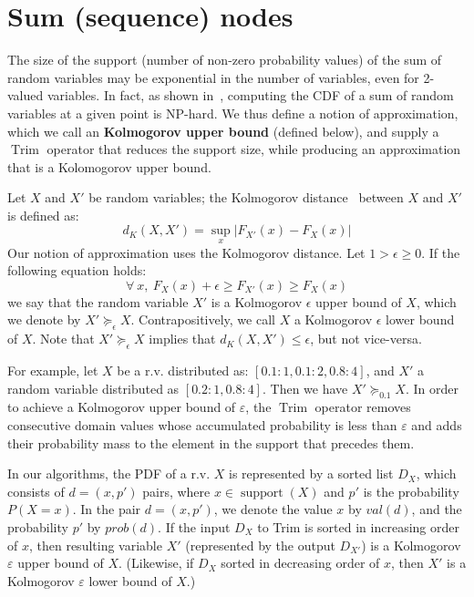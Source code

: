 \documentclass{article}
\DeclareMathOperator{\support}{support}
\DeclareMathOperator{\Trim}{Trim}
\begin{document}
 
\section{Sum (sequence) nodes}\label{sec:seq}

The size of the support (number of non-zero probability values) of the sum of random variables
may be exponential in the number of variables, even for 2-valued variables.
In fact, as shown in~\cite{}, computing the CDF of a sum of random variables at a given point is NP-hard.
We thus define a notion of approximation, 
which we call an {\bf Kolmogorov upper bound} (defined below),
and supply a $\Trim$ operator that reduces the support size, while 
producing an approximation that is a Kolomogorov upper bound.

Let $X$ and $X'$ be random variables; 
the Kolmogorov distance~\cite{} between $X$ and $X'$ is defined as:
\[
d_K(X,X') = \sup_{x} |F_{X'}(x)-F_X(x)|
\]
Our notion of approximation uses the Kolmogorov distance. Let $1 > \epsilon \geq 0$.
If the following equation holds:
\[
\forall ~ x, ~ F_X(x)+\epsilon \geq F_{X'}(x) \geq F_X(x)
\]
we say that the random variable $X'$ is a Kolmogorov $\epsilon$ upper bound of $X$,
which we denote by $X' \succeq_\epsilon X$. Contrapositively, we call $X$ a  Kolmogorov $\epsilon$ lower
bound of $X$. Note that $X' \succeq_\epsilon X$ implies that $d_K(X,X') \leq \epsilon$,
but not vice-versa.

For example, let $X$ be a r.v. distributed as: $[0.1:1, 0.1:2, 0.8:4]$, and $X'$
a random variable distributed as $[0.2:1, 0.8:4]$. Then we have
$X' \succeq_{0.1} X$. In order to achieve a Kolmogorov upper bound of $\varepsilon $,
the $\Trim$ operator removes  consecutive domain values whose accumulated probability is
less than $\varepsilon$ and adds 
their probability mass to the element in the support that precedes them.

In our  algorithms, the PDF of a r.v. $X$ is represented by a sorted list $D_X$, 
which consists of $d=(x, p')$ pairs, where $x\in \support(X)$
and $p'$ is the probability $P(X{=}x)$. In the pair $d=(x, p')$, we denote the value $x$
by $val(d)$, and the probability $p'$ by $prob(d)$.
If the input $D_X$ to Trim is sorted in increasing order of $x$,
then resulting variable $X'$ (represented by the output $D_{X'}$) 
is a Kolmogorov $\varepsilon$ upper bound of $X$.
(Likewise, if $D_X$ sorted in decreasing order of $x$,
then $X'$ is a Kolmogorov $\varepsilon$ lower bound of $X$.)
\end{document}

